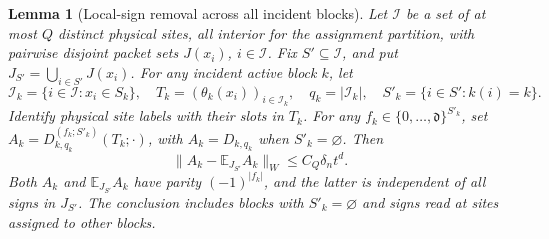 \documentclass[11pt]{article}
\newtheorem{lemma}[lemma]{Lemma}
\newcommand{\E}{\mathbb{E}}
\newcommand{\norm}[1]{\lVert #1\rVert}
\newcommand{\abs}[1]{\lvert #1\rvert}
\newcommand{\dg}{\mathfrak{d}}
\begin{document}
\begin{lemma}[Local-sign removal across all incident blocks]\label{C:lem:cross-block}
Let \(\mathcal I\) be a set of at most \(Q\) distinct physical sites,
all interior for the assignment partition, with pairwise disjoint
packet sets \(J(x_i)\), \(i\in\mathcal I\).  Fix
\(S'\subseteq\mathcal I\), and put
\(J_{S'}=\bigcup_{i\in S'}J(x_i)\).
For any incident active block \(k\), let
\[
 \mathcal I_k=\{i\in\mathcal I:x_i\in S_k\},\quad
 T_k=(\theta_k(x_i))_{i\in\mathcal I_k},\quad q_k=\abs{\mathcal I_k},
 \quad S'_k=\{i\in S':k(i)=k\}.
\]
Identify physical site labels with their slots in \(T_k\).
For any \(f_k\in\{0,\dots,\dg\}^{S'_k}\), set
\(A_k=D_{k,q_k}^{(f_k;S'_k)}(T_k;\cdot)\), with
\(A_k=D_{k,q_k}\) when \(S'_k=\varnothing\).  Then
\[
 \norm{A_k-\E_{J_{S'}}A_k}_W\le C_Q\delta_nt^d .
\]
Both \(A_k\) and \(\E_{J_{S'}}A_k\) have parity
\((-1)^{\abs{f_k}}\), and the latter is independent of all signs in
\(J_{S'}\).  The conclusion includes blocks with \(S'_k=\varnothing\)
and signs read at sites assigned to other blocks.
\end{lemma}
\end{document}
